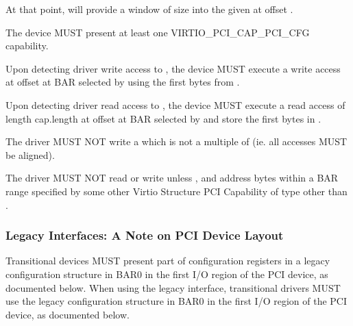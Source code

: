 At that point,  will provide a window of size
 into the given  at offset .


The device MUST present at least one VIRTIO_PCI_CAP_PCI_CFG capability.

Upon detecting driver write access
to , the device MUST execute a write access
at offset  at BAR selected by  using the first 
bytes from .

Upon detecting driver read access
to , the device MUST
execute a read access of length cap.length at offset 
at BAR selected by  and store the first  bytes in
.


The driver MUST NOT write a  which is not
a multiple of  (ie. all accesses MUST be aligned).

The driver MUST NOT read or write 
unless ,  and 
address  bytes within a BAR range
specified by some other Virtio Structure PCI Capability
of type other than .

\subsubsection{Legacy Interfaces: A Note on PCI Device Layout}\label{sec:Virtio Transport Options / Virtio Over PCI Bus / PCI Device Layout / Legacy Interfaces: A Note on PCI Device Layout}

Transitional devices MUST present part of configuration
registers in a legacy configuration structure in BAR0 in the first I/O
region of the PCI device, as documented below.
When using the legacy interface, transitional drivers
MUST use the legacy configuration structure in BAR0 in the first
I/O region of the PCI device, as documented below.

